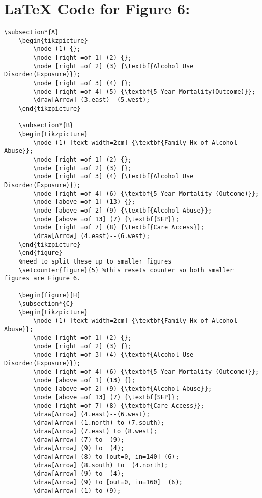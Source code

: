 \documentclass{article}
\begin{document}
\section*{\LaTeX\hspace*{1mm} Code for Figure 6:}
\begin{lstlisting}[frame=single, basicstyle=\ttfamily]
    \subsection*{A}
    \begin{tikzpicture}
        \node (1) {};
        \node [right =of 1] (2) {};
        \node [right =of 2] (3) {\textbf{Alcohol Use Disorder(Exposure)}};
        \node [right =of 3] (4) {};
        \node [right =of 4] (5) {\textbf{5-Year Mortality(Outcome)}};
        \draw[Arrow] (3.east)--(5.west);
    \end{tikzpicture}
    
    \subsection*{B}
    \begin{tikzpicture}
        \node (1) [text width=2cm] {\textbf{Family Hx of Alcohol Abuse}};
        \node [right =of 1] (2) {};
        \node [right =of 2] (3) {};
        \node [right =of 3] (4) {\textbf{Alcohol Use Disorder(Exposure)}};
        \node [right =of 4] (6) {\textbf{5-Year Mortality (Outcome)}};
        \node [above =of 1] (13) {};
        \node [above =of 2] (9) {\textbf{Alcohol Abuse}};
        \node [above =of 13] (7) {\textbf{SEP}};
        \node [right =of 7] (8) {\textbf{Care Access}};
        \draw[Arrow] (4.east)--(6.west);
    \end{tikzpicture}
    \end{figure}
    %need to split these up to smaller figures
    \setcounter{figure}{5} %this resets counter so both smaller figures are Figure 6.
    
    \begin{figure}[H]
    \subsection*{C}
    \begin{tikzpicture}
        \node (1) [text width=2cm] {\textbf{Family Hx of Alcohol Abuse}};
        \node [right =of 1] (2) {};
        \node [right =of 2] (3) {};
        \node [right =of 3] (4) {\textbf{Alcohol Use Disorder(Exposure)}};
        \node [right =of 4] (6) {\textbf{5-Year Mortality (Outcome)}};
        \node [above =of 1] (13) {};
        \node [above =of 2] (9) {\textbf{Alcohol Abuse}};
        \node [above =of 13] (7) {\textbf{SEP}};
        \node [right =of 7] (8) {\textbf{Care Access}};
        \draw[Arrow] (4.east)--(6.west);
        \draw[Arrow] (1.north) to (7.south);
        \draw[Arrow] (7.east) to (8.west);
        \draw[Arrow] (7) to  (9);
        \draw[Arrow] (9) to  (4);
        \draw[Arrow] (8) to [out=0, in=140] (6);
        \draw[Arrow] (8.south) to  (4.north);
        \draw[Arrow] (9) to  (4);
        \draw[Arrow] (9) to [out=0, in=160]  (6);
        \draw[Arrow] (1) to (9);
        

\end{lstlisting}
\end{document}
